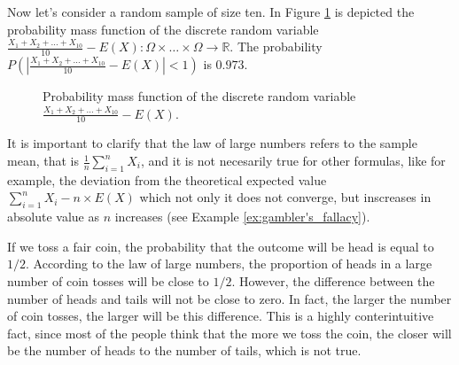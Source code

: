 \begin{example}
Now let's consider a random sample of size ten. In Figure \ref{fig:law_large_numbers_2} is depicted the probability mass function of the discrete random variable $\frac{X_1 + X_2 + \ldots +  X_{10}}{10} - E(X): \Omega \times \ldots \times \Omega \rightarrow \mathbb{R}$. The probability $P(  |\frac{X_1 + X_2 + \ldots +  X_{10}}{10} - E(X)| < 1 )$ is $0.973$.

\begin{figure}[t]
\centering
{}
\caption{\label{fig:law_large_numbers_2}Probability mass function of the discrete random variable $\frac{X_1 + X_2 + \ldots +  X_{10}}{10} - E(X)$.}
\end{figure}

\end{example}

It is important to clarify that the law of large numbers refers to the sample mean, that is $\frac {1}{n} \sum_{i=1}^{n} X_{i}$, and it is not necesarily true for other formulas, like for example, the deviation from the theoretical expected value $\sum_{i=1}^{n} X_{i} - n \times E(X)$ which not only it does not converge, but inscreases in absolute value as $n$ increases (see Example \ref{ex:gambler's_fallacy}).

\begin{example}
\label{ex:gambler's_fallacy}
If we toss a fair coin, the probability that the outcome will be head is equal to $1/2$. According to the law of large numbers, the proportion of heads in a large number of coin tosses will be close to $1/2$. However, the difference between the number of heads and tails will not be close to zero. In fact, the larger the number of coin tosses, the larger will be this difference. This is a highly conterintuitive fact, since most of the people think that the more we toss the coin, the closer will be the number of heads to the number of tails, which is not true.
\end{example}

